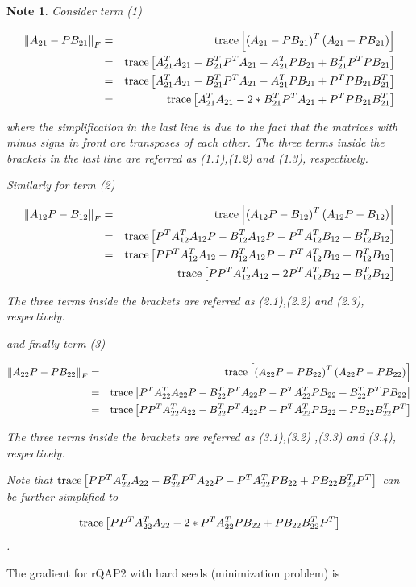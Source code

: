 \documentclass[12pt]{article}
\newcommand{\tr}{\textup{trace}}
\newtheorem{note}[theorem]{Note}
\begin{document}
\begin{note}
Consider term (1)

\begin{align*}
\left\Vert A_{21}-PB_{21}\right\Vert _{F} & = & \tr\left[\left(A_{21}-PB_{21}\right)^{T}\left(A_{21}-PB_{21}\right)\right]\\
 & = & \tr\left[A_{21}^{T}A_{21}-B_{21}^{T}P^{T}A_{21}-A_{21}^{T}PB_{21}+B_{21}^{T}P^{T}PB_{21}\right]\\
 & = & \tr\left[A_{21}^{T}A_{21}-B_{21}^{T}P^{T}A_{21}-A_{21}^{T}PB_{21}+P^{T}PB_{21}B_{21}^{T}\right]\\
 & = & \tr\left[A_{21}^{T}A_{21}-2*B_{21}^{T}P^{T}A_{21}+P^{T}PB_{21}B_{21}^{T}\right]
\end{align*}


where the simplification in the last line is due to the fact that
the matrices with minus signs in front are transposes of each other.
The three terms inside the brackets in the last line are referred
as (1.1),(1.2) and (1.3), respectively.

Similarly for term (2)

\begin{align*}
\left\Vert A_{12}P-B_{12}\right\Vert _{F} & = & \tr\left[\left(A_{12}P-B_{12}\right)^{T}\left(A_{12}P-B_{12}\right)\right]\\
 & = & \tr\left[P^{T}A_{12}^{T}A_{12}P-B_{12}^{T}A_{12}P-P^{T}A_{12}^{T}B_{12}+B_{12}^{T}B_{12}\right]\\
 & = & \tr\left[PP^{T}A_{12}^{T}A_{12}-B_{12}^{T}A_{12}P-P^{T}A_{12}^{T}B_{12}+B_{12}^{T}B_{12}\right]\\
 &  & \tr\left[PP^{T}A_{12}^{T}A_{12}-2P^{T}A_{12}^{T}B_{12}+B_{12}^{T}B_{12}\right]
\end{align*}


The three terms inside the brackets are referred as (2.1),(2.2) and
(2.3), respectively.

and finally term (3)

\begin{align*}
\left\Vert A_{22}P-PB_{22}\right\Vert _{F} & = & \tr\left[\left(A_{22}P-PB_{22}\right)^{T}\left(A_{22}P-PB_{22}\right)\right]\\
 & = & \tr\left[P^{T}A_{22}^{T}A_{22}P-B_{22}^{T}P^{T}A_{22}P-P^{T}A_{22}^{T}PB_{22}+B_{22}^{T}P^{T}PB_{22}\right]\\
 & = & \tr\left[PP^{T}A_{22}^{T}A_{22}-B_{22}^{T}P^{T}A_{22}P-P^{T}A_{22}^{T}PB_{22}+PB_{22}B_{22}^{T}P^{T}\right]
\end{align*}


The three terms inside the brackets are referred as (3.1),(3.2) ,(3.3)
and (3.4), respectively.

Note that $\tr\left[PP^{T}A_{22}^{T}A_{22}-B_{22}^{T}P^{T}A_{22}P-P^{T}A_{22}^{T}PB_{22}+PB_{22}B_{22}^{T}P^{T}\right]$
can be further simplified to 

\[
\tr\left[PP^{T}A_{22}^{T}A_{22}-2*P^{T}A_{22}^{T}PB_{22}+PB_{22}B_{22}^{T}P^{T}\right]
\]
.
\end{note}
The gradient for rQAP2 with hard seeds (minimization problem) is
\end{document}
